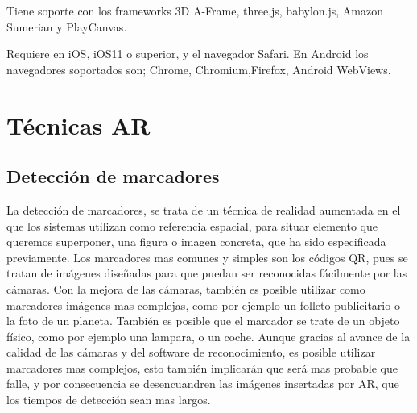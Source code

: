 Tiene soporte con los frameworks 3D A-Frame, three.js, babylon.js, Amazon Sumerian y PlayCanvas.

Requiere en iOS, iOS11 o superior, y el navegador Safari. En Android los navegadores soportados son; Chrome, Chromium,Firefox, Android WebViews.

\section{Técnicas AR}
	\subsection{Detección de marcadores}
	La detección de marcadores, se trata de un técnica de realidad aumentada en el que los sistemas utilizan como referencia espacial, para situar elemento que queremos superponer, una figura o imagen concreta, que ha sido especificada previamente. Los marcadores mas comunes y simples son los códigos QR, pues se tratan de imágenes diseñadas para que puedan ser reconocidas fácilmente por las cámaras.
	Con la mejora de las cámaras, también es posible utilizar como marcadores imágenes mas complejas, como por ejemplo un folleto publicitario o la foto de un planeta.
	También es posible que el marcador se trate de un objeto físico, como por ejemplo una lampara, o un coche.
	Aunque gracias al avance de la calidad de las cámaras y del software de reconocimiento, es posible utilizar marcadores mas complejos, esto también implicarán que será mas probable que falle, y por consecuencia se desencuandren las imágenes insertadas por AR, que los tiempos de detección sean mas largos.
	
